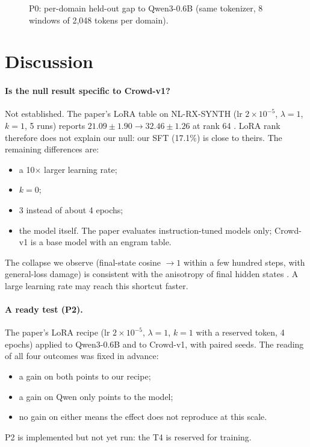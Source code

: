 \documentclass[11pt]{article}
\begin{document}
\begin{figure}[t]
\centering
{}
\caption{P0: per-domain held-out gap to Qwen3-0.6B (same tokenizer, 8 windows of 2{,}048 tokens per domain).}
\label{fig:p0}
\end{figure}

\section{Discussion}
\label{sec:disc}
\paragraph{Is the null result specific to Crowd-v1?} Not established. The paper's LoRA table on NL-RX-SYNTH (lr
$2\times10^{-5}$, $\lambda=1$, $k=1$, 5 runs) reports $21.09\pm1.90\to32.46\pm1.26$ at rank 64 \cite{huang2025llmjepa}.
LoRA rank therefore does not explain our null: our SFT (17.1\%) is close to theirs. The remaining differences are:
\begin{itemize}
\item a 10$\times$ larger learning rate;
\item $k=0$;
\item 3 instead of about 4 epochs;
\item the model itself. The paper evaluates instruction-tuned models only; Crowd-v1 is a base model with an engram table.
\end{itemize}
The collapse we observe (final-state cosine $\to1$ within a few hundred steps, with general-loss damage) is consistent
with the anisotropy of final hidden states \cite{ethayarajh2019contextual}. A large learning rate may reach this
shortcut faster.

\paragraph{A ready test (P2).} The paper's LoRA recipe (lr $2\times10^{-5}$, $\lambda=1$, $k=1$ with a reserved token, 4
epochs) applied to Qwen3-0.6B and to Crowd-v1, with paired seeds. The reading of all four outcomes was fixed in advance:
\begin{itemize}
\item a gain on both points to our recipe;
\item a gain on Qwen only points to the model;
\item no gain on either means the effect does not reproduce at this scale.
\end{itemize}
P2 is implemented but not yet run: the T4 is reserved for training.
\end{document}
